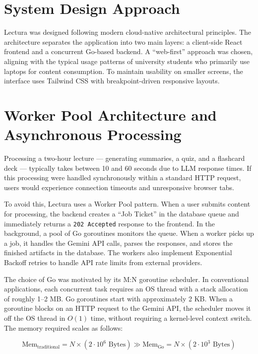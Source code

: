 \section{System Design Approach}
Lectura was designed following modern cloud-native architectural principles. The architecture separates the application into two main layers: a client-side React frontend and a concurrent Go-based backend. A ``web-first'' approach was chosen, aligning with the typical usage patterns of university students who primarily use laptops for content consumption. To maintain usability on smaller screens, the interface uses Tailwind CSS with breakpoint-driven responsive layouts.

\section{Worker Pool Architecture and Asynchronous Processing}
Processing a two-hour lecture — generating summaries, a quiz, and a flashcard deck — typically takes between 10 and 60 seconds due to LLM response times. If this processing were handled synchronously within a standard HTTP request, users would experience connection timeouts and unresponsive browser tabs.

To avoid this, Lectura uses a Worker Pool pattern. When a user submits content for processing, the backend creates a ``Job Ticket'' in the database queue and immediately returns a \texttt{202 Accepted} response to the frontend. In the background, a pool of Go goroutines monitors the queue. When a worker picks up a job, it handles the Gemini API calls, parses the responses, and stores the finished artifacts in the database. The workers also implement Exponential Backoff retries to handle API rate limits from external providers.

The choice of Go was motivated by its M:N goroutine scheduler. In conventional applications, each concurrent task requires an OS thread with a stack allocation of roughly 1--2 MB. Go goroutines start with approximately 2 KB. When a goroutine blocks on an HTTP request to the Gemini API, the scheduler moves it off the OS thread in $O(1)$ time, without requiring a kernel-level context switch. The memory required scales as follows:

\begin{equation}
    \text{Mem}_{\text{traditional}} = N \times (2 \cdot 10^6 \text{ Bytes}) \gg \text{Mem}_{\text{Go}} = N \times (2 \cdot 10^3 \text{ Bytes})
\end{equation}

